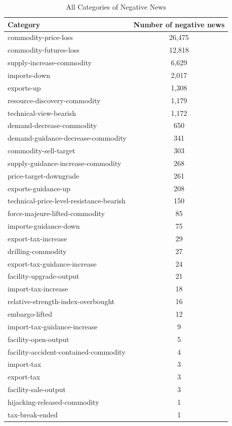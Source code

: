 \documentclass[12pt]{article}
\begin{document}
	\begin{table}[H]
		\centering
		\small
		\caption{All Categories of Negative News}
		\begin{tabular}{l|c}
			\toprule
			Category & Number of negative news \\
			\midrule
commodity-price-loss&26,475\\
commodity-futures-loss&12,818\\
supply-increase-commodity&6,629\\
imports-down&2,017\\
exports-up&1,308\\
resource-discovery-commodity&1,179\\
technical-view-bearish&1,172\\
demand-decrease-commodity&650\\
demand-guidance-decrease-commodity&341\\
commodity-sell-target&303\\
supply-guidance-increase-commodity&268\\
price-target-downgrade&261\\
exports-guidance-up&208\\
technical-price-level-resistance-bearish&150\\
force-majeure-lifted-commodity&85\\
imports-guidance-down&75\\
export-tax-increase&29\\
drilling-commodity&27\\
export-tax-guidance-increase&24\\
facility-upgrade-output&21\\
import-tax-increase&18\\
relative-strength-index-overbought&16\\
embargo-lifted&12\\
import-tax-guidance-increase&9\\
facility-open-output&5\\
facility-accident-contained-commodity&4\\
import-tax&3\\
export-tax&3\\
facility-sale-output&3\\
hijacking-released-commodity&1\\
tax-break-ended&1\\
			\bottomrule
		\end{tabular}
	\end{table}
	
\end{document}
